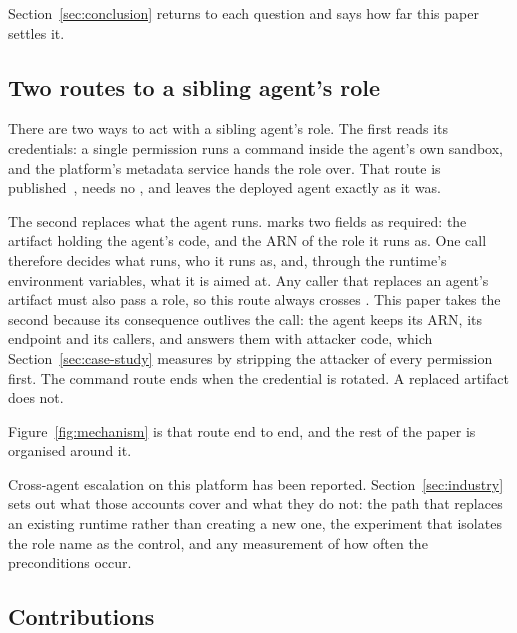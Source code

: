 Section~\ref{sec:conclusion} returns to each question and says how far this
paper settles it.

\subsection{Two routes to a sibling agent's role}

There are two ways to act with a sibling agent's role. The first reads its
credentials: a single permission runs a command inside the agent's own
sandbox, and the platform's metadata service hands the role over. That route
is published~\cite{garcia2026agentcorepaths}, needs no
, and leaves the deployed agent exactly as it was.

The second replaces what the agent runs.
 marks two
fields as required: the artifact holding the agent's code, and the ARN of the
role it runs as. One call therefore decides what runs, who it runs as, and,
through the runtime's environment variables, what it is aimed at. Any caller
that replaces an agent's artifact must also pass a role, so this route always
crosses . 
This paper takes the second because its consequence outlives the call: the
agent keeps its ARN, its endpoint and its callers, and answers them with
attacker code, which Section~\ref{sec:case-study} measures by stripping the
attacker of every permission first. The command route ends when the credential
is rotated. A replaced artifact does not.

Figure~\ref{fig:mechanism} is that route end to end, and the rest of the paper
is organised around it.



Cross-agent escalation on this platform has been reported.
Section~\ref{sec:industry} sets out what those accounts cover and what
they do not: the path that replaces an existing runtime rather than creating a
new one, the experiment that isolates the role name as the control, and any
measurement of how often the preconditions occur.

\subsection{Contributions}

